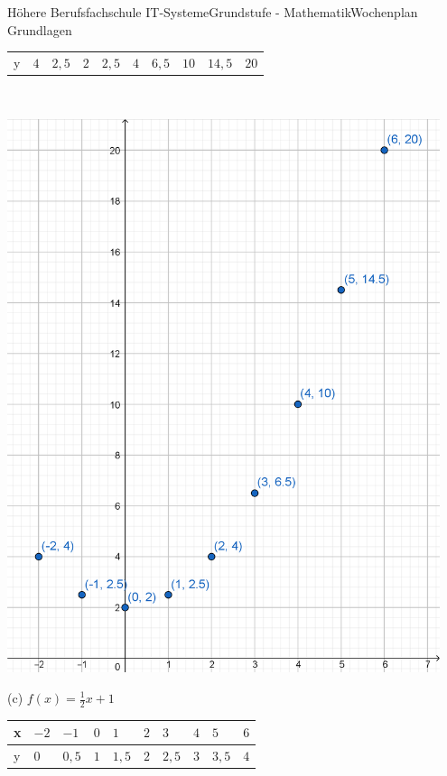 \documentclass[oneside,openany,headings=optiontotoc,11pt,numbers=noenddot]{scrreprt}
\begin{document}
\begin{worksheet}{Höhere Berufsfachschule IT-Systeme}{Grundstufe - Mathematik}{Wochenplan Grundlagen}
\begin{framed}
\begin{tabularx}{\textwidth}{l|M|M|M|M|M|M|M|M|M}
				\hline
				y & \(4\) & \(2,5\) & \(2\) & \(2,5\) & \(4\) & \(6,5\) & \(10\) & \(14,5\) & \(20\)\\  
			\end{tabularx}\\
			\par\bigskip\noindent
			\includegraphics[width=0.95\textwidth]{../99_Bilder/WP3Dob.png}\\
			\par\noindent
			(c) \(f(x) = \frac{1}{2}x +1\)\\
			\begin{tabularx}{\textwidth}{l|M|M|M|M|M|M|M|M|M}
				x & \(-2\) & \(-1\) & \(0\) & \(1\) & \(2\) & \(3\) & \(4\) & \(5\) & \(6\)\\
				\hline
				y & \(0\) & \(0,5\) & \(1\) & \(1,5\) & \(2\) & \(2,5\) & \(3\) & \(3,5\) & \(4\)\\ 
			\end{tabularx}\\
			\par\noindent

\end{framed}
\end{worksheet}
\end{document}
